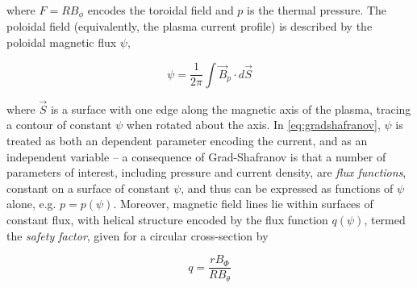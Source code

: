 \noindent where $F = RB_\phi$ encodes the toroidal field and $p$ is the thermal pressure.  The poloidal field (equivalently, the plasma current profile) is described by the poloidal magnetic flux $\psi$,

\begin{equation}\label{eq:psi}
 \psi = \frac{1}{2\pi} \int \vec{B}_p \cdot d\vec{S}
\end{equation}

\noindent where $\vec{S}$ is a surface with one edge along the magnetic axis of the plasma, tracing a contour of constant $\psi$ when rotated about the axis.  In \cref{eq:gradshafranov}, $\psi$ is treated as both an dependent parameter encoding the current, and as an independent variable -- a consequence of Grad-Shafranov is that a number of parameters of interest, including pressure and current density, are \emph{flux functions}, constant on a surface of constant $\psi$, and thus can be expressed as functions of $\psi$ alone, e.g. $p = p(\psi)$.  Moreover, magnetic field lines lie within surfaces of constant flux, with helical structure encoded by the flux function $q(\psi)$, termed the \emph{safety factor}, given for a circular cross-section by

\begin{equation}\label{eq:q}
 q = \frac{rB_\Phi}{RB_\theta}
\end{equation}

\begin{figure}
 \pushtooutside
\end{figure}

